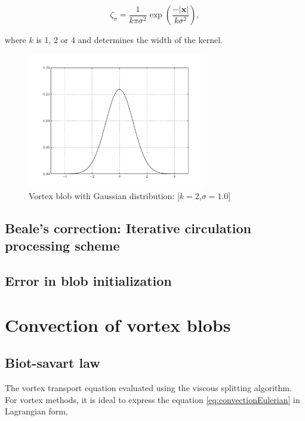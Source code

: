 \begin{equation}
\zeta_{\sigma} = \frac{1}{k\pi\sigma^2}\exp\left(\frac{-\left|\mathbf{x}\right|}{k\sigma^2}\right),
\end{equation}

where $k$ is 1, 2 or 4 and determines the width of the kernel.

\begin{figure}
	\centering
	\includegraphics[width=0.7\textwidth]{figures/lagrangian/gaussianKernel.pdf}
	\caption{Vortex blob with Gaussian distribution: [$k=2$,$\sigma=1.0$]}
\end{figure}


\subsection{Beale's correction: Iterative circulation processing scheme}


\subsection{Error in blob initialization}

\section{Convection of vortex blobs}


\subsection{Biot-savart law}
The vortex transport equation evaluated using the viscous splitting algorithm. For vortex methods, it is ideal to express the equation \ref{eq:convectionEulerian} in Lagrangian form,

